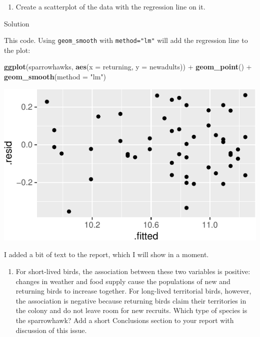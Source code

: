 \documentclass[]{tufte-book}
\newenvironment{Shaded}{}{}
\newcommand{\DataTypeTok}[1]{\textcolor[rgb]{0.56,0.13,0.00}{#1}}
\newcommand{\KeywordTok}[1]{\textcolor[rgb]{0.00,0.44,0.13}{\textbf{#1}}}
\newcommand{\NormalTok}[1]{#1}
\newcommand{\OperatorTok}[1]{\textcolor[rgb]{0.40,0.40,0.40}{#1}}
\newcommand{\StringTok}[1]{\textcolor[rgb]{0.25,0.44,0.63}{#1}}
\providecommand{\tightlist}{%
  \setlength{\itemsep}{0pt}\setlength{\parskip}{0pt}}
\theoremstyle{definition}
\theoremstyle{definition}
\theoremstyle{definition}
\theoremstyle{remark}
\begin{document}
\begin{enumerate}
\def\labelenumi{(\alph{enumi})}
\setcounter{enumi}{6}
\tightlist
\item
  Create a scatterplot of the data with the regression line on it.
\end{enumerate}

Solution

This code. Using \texttt{geom\_smooth} with \texttt{method="lm"} will
add the regression line to the plot:

\begin{Shaded}
\begin{Highlighting}[]
\KeywordTok{ggplot}\NormalTok{(sparrowhawks, }\KeywordTok{aes}\NormalTok{(}\DataTypeTok{x =}\NormalTok{ returning, }\DataTypeTok{y =}\NormalTok{ newadults)) }\OperatorTok{+}\StringTok{ }
\StringTok{    }\KeywordTok{geom_point}\NormalTok{() }\OperatorTok{+}\StringTok{ }\KeywordTok{geom_smooth}\NormalTok{(}\DataTypeTok{method =} \StringTok{"lm"}\NormalTok{)}
\end{Highlighting}
\end{Shaded}

\includegraphics{12-regression_files/figure-latex/unnamed-chunk-80-1}

I added a bit of text to the report, which I will show in a moment.

\begin{enumerate}
\def\labelenumi{(\alph{enumi})}
\setcounter{enumi}{7}
\tightlist
\item
  For short-lived birds, the association between these two variables is
  positive: changes in weather and food supply cause the populations of
  new and returning birds to increase together. For long-lived
  territorial birds, however, the association is negative because
  returning birds claim their territories in the colony and do not leave
  room for new recruits. Which type of species is the sparrowhawk? Add a
  short Conclusions section to your report with discussion of this
  issue.
\end{enumerate}
\end{document}
